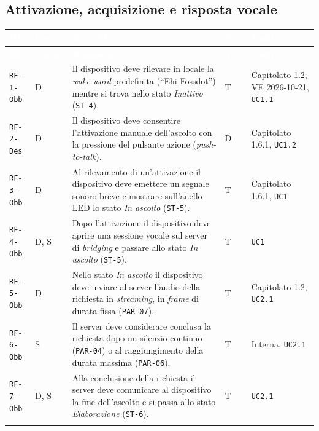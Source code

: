 \documentclass[12pt,a4paper]{article}
\newcommand{\thc}[1]{\textcolor{white}{\textbf{#1}}}
\newcommand{\rl}{\\ \arrayrulecolor{bfline}\hline}
\begin{document}
\subsection{Attivazione, acquisizione e risposta vocale}
\begin{longtable}{>{\raggedright\arraybackslash}p{}>{\centering\arraybackslash}p{}>{\raggedright\arraybackslash}p{}>{\centering\arraybackslash}p{}>{\raggedright\arraybackslash}p{}}
\rowcolor{bfblue}\thc{ID} & \thc{Comp.} & \thc{Requisito} & \thc{Ver.} & \thc{Fonti} \\ \endfirsthead
\rowcolor{bfblue}\thc{ID} & \thc{Comp.} & \thc{Requisito} & \thc{Ver.} & \thc{Fonti} \\ \endhead
\texttt{RF-1-Obb} & D & Il dispositivo deve rilevare in locale la \emph{wake word} predefinita (``Ehi Fossdot'') mentre si trova nello stato \emph{Inattivo} (\texttt{ST-4}). & T & Capitolato 1.2, VE 2026-10-21, \texttt{UC1.1} \rl

\texttt{RF-2-Des} & D & Il dispositivo deve consentire l'attivazione manuale dell'ascolto con la pressione del pulsante azione (\emph{push-to-talk}). & D & Capitolato 1.6.1, \texttt{UC1.2} \rl

\texttt{RF-3-Obb} & D & Al rilevamento di un'attivazione il dispositivo deve emettere un segnale sonoro breve e mostrare sull'anello LED lo stato \emph{In ascolto} (\texttt{ST-5}). & T & Capitolato 1.6.1, \texttt{UC1} \rl

\texttt{RF-4-Obb} & D, S & Dopo l'attivazione il dispositivo deve aprire una sessione vocale sul server di \emph{bridging} e passare allo stato \emph{In ascolto} (\texttt{ST-5}). & T & \texttt{UC1} \rl

\texttt{RF-5-Obb} & D & Nello stato \emph{In ascolto} il dispositivo deve inviare al server l'audio della richiesta in \emph{streaming}, in \emph{frame} di durata fissa (\texttt{PAR-07}). & T & Capitolato 1.2, \texttt{UC2.1} \rl

\texttt{RF-6-Obb} & S & Il server deve considerare conclusa la richiesta dopo un silenzio continuo (\texttt{PAR-04}) o al raggiungimento della durata massima (\texttt{PAR-06}). & T & Interna, \texttt{UC2.1} \rl

\texttt{RF-7-Obb} & D, S & Alla conclusione della richiesta il server deve comunicare al dispositivo la fine dell'ascolto e si passa allo stato \emph{Elaborazione} (\texttt{ST-6}). & T & \texttt{UC2.1} \rl


\end{longtable}
\end{document}

